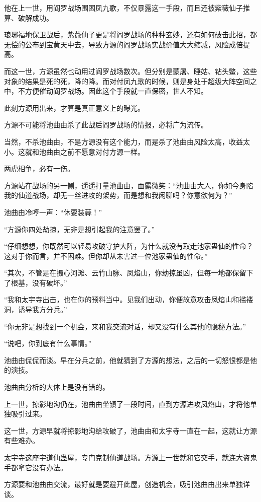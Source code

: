 \begin{this_body}
他在上一世，用阎罗战场围困凤九歌，不仅暴露这一手段，而且还被紫薇仙子推算、破解成功。

琅琊福地保卫战后，紫薇仙子更是将阎罗战场的种种玄妙，还有如何破击此招，都无偿的公布到宝黄天中去，导致方源的阎罗战场实战价值大大缩减，风险成倍提高。

而这一世，方源虽然也动用过阎罗战场数次。但分别是蒙屠、睡姑、钻头鳖，这些对象的结果是死的死，降的降。而对付凤九歌的时候，则是身处于超级大阵空间之中，不方便催动阎罗战场。因此这个手段就一直保密，世人不知。

此刻方源用出来，才算是真正意义上的曝光。

方源不可能将池曲由杀了此战后阎罗战场的情报，必将广为流传。

当然，不杀池曲由，不是方源没有这个能力，而是杀了池曲由风险太高，收益太小。这就和池曲由之前不愿意对付方源一样。

两虎相争，必有一伤。

方源站在战场的另一侧，遥遥打量池曲由，面露微笑：“池曲由大人，你如今身陷我的仙道战场，却无一丝进攻的架势，而是想和我闲聊吗？你意欲何为？”

池曲由冷哼一声：“休要装蒜！”

“方源你四处劫掠，无非是想引起我的注意罢了。”

“仔细想想，你既然可以轻易攻破守护大阵，为什么就没有取走池家蛊仙的性命？这对于你而言，并不困难。但你却从未害过一位池家蛊仙的性命。”

“其次，不管是在摄心河滩、云竹山脉、凤焰山，你劫掠虽凶，但每一地都保留下了根基，没有破坏。”

“我和太宇寺出击，也在你的预料当中。见我们出动，你便故意攻击凤焰山和褴褛洞，诱导我方分兵。”

“你无非是想找到一个机会，来和我交流对话，却又没有什么其他的隐秘方法。”

“说吧，你到底有什么事情。”

池曲由侃侃而谈。早在分兵之前，他就猜到了方源的想法，之后的一切怒恨都是他的演技。

池曲由分析的大体上是没有错的。

上一世，掠影地沟仍在，池曲由坐镇了一段时间，直到方源进攻凤焰山，才将他单独吸引过来。

这一世，方源早就将掠影地沟给攻破了，池曲由和太宇寺一直在一起，这就让方源有些难办。

太宇寺这座宇道仙蛊屋，专门克制仙道战场。方源上一世就和它交手，就连大盗鬼手都拿它没有办法。

方源要和池曲由交流，最好就是要避开此屋，创造机会，吸引池曲由出来单独详谈。


\end{this_body}
